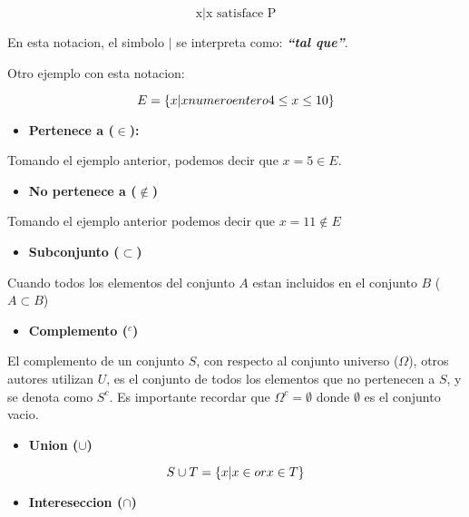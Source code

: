 \documentclass[]{book}
\providecommand{\tightlist}{%
  \setlength{\itemsep}{0pt}\setlength{\parskip}{0pt}}
\begin{document}
\[\text{{x|x satisface P}}\]

En esta notacion, el simbolo \emph{\(|\)} se interpreta como:
\textbf{\emph{``tal que''}}.

Otro ejemplo con esta notacion:

\[ E = \{x|x \space numero\space entero\space 4 \leq x \leq 10\}\]

\begin{itemize}
\tightlist
\item
  \textbf{Pertenece a (\(\in\)):}
\end{itemize}

Tomando el ejemplo anterior, podemos decir que \(x = 5 \in E\).

\begin{itemize}
\tightlist
\item
  \textbf{No pertenece a (\(\notin\))}
\end{itemize}

Tomando el ejemplo anterior podemos decir que \(x = 11 \notin E\)

\begin{itemize}
\tightlist
\item
  \textbf{Subconjunto (\(\subset\))}
\end{itemize}

Cuando todos los elementos del conjunto \(A\) estan incluidos en el
conjunto \(B\) (\(A \subset B\))

\begin{itemize}
\tightlist
\item
  \textbf{Complemento (\(^c\))}
\end{itemize}

El complemento de un conjunto \(S\), con respecto al conjunto universo
(\(\Omega\)), otros autores utilizan \(U\), es el conjunto de todos los
elementos que no pertenecen a \(S\), y se denota como \(S^c\). Es
importante recordar que \(\Omega^c = \emptyset\) donde \(\emptyset\) es
el conjunto vacio.

\begin{itemize}
\tightlist
\item
  \textbf{Union (\(\cup\))}
\end{itemize}

\[S \cup T = \{x|x \in or\space x\in T\}\]

\begin{itemize}
\tightlist
\item
  \textbf{Intereseccion (\(\cap\))}
\end{itemize}
\end{document}
